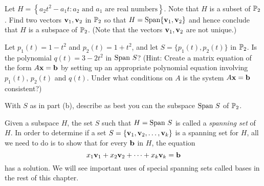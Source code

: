 \begin{activity} \label{act:5_a_4} ~
	\ba
	\item Let $H = \left\{ a_2t^2-a_1t : a_2 \text{ and } a_1 \text{ are real numbers}\right\}$. Note that $H$ is a subset of $\mathbb{P}_2$. Find two vectors $\mathbf{v}_1, \mathbf{v}_2$ in $\mathbb{P}_2$ so that $H= \text{Span}\{\mathbf{v}_1, \mathbf{v}_2\}$ and hence conclude that $H$ is a subspace of $\mathbb{P}_2$. (Note that the vectors $\mathbf{v}_1, \mathbf{v}_2$ are not unique.)
	
	\item Let $p_1(t) = 1-t^2$ and $p_2(t) = 1+t^2$, and let $S = \{p_1(t), p_2(t)\}$ in $\mathbb{P}_2$. Is the polynomial $q(t) = 3-2t^2$ in $\text{Span} \ S$? (Hint: Create a matrix equation of the form $A \mathbf{x} = \mathbf{b}$ by setting up an appropriate polynomial equation involving $p_1(t)$, $p_2(t)$ and $q(t)$. Under what conditions on $A$ is the system $A \mathbf{x} = \mathbf{b}$ consistent?) 

	\item With $S$ as in part (b), describe as best you can the subspace $\text{Span} \ S$ of $\mathbb{P}_2$. 

	\ea
		
\end{activity}

Given a subspace $H$, the set $S$ such that $H=\text{Span} \ S$ is called a \emph{spanning set} of $H$. In order to determine if a set $S=\{\mathbf{v}_1, \mathbf{v}_2, \ldots, \mathbf{v}_k\}$ is a spanning set for $H$, all we need to do is to show that for every $\mathbf{b}$ in $H$, the equation
\[ x_1 \mathbf{v}_1 + x_2\mathbf{v}_2 + \cdots + x_k \mathbf{v}_k = \mathbf{b} \]
has a solution. We will see important uses of special spanning sets called bases in the rest of this chapter. 


\ExampleIntro

